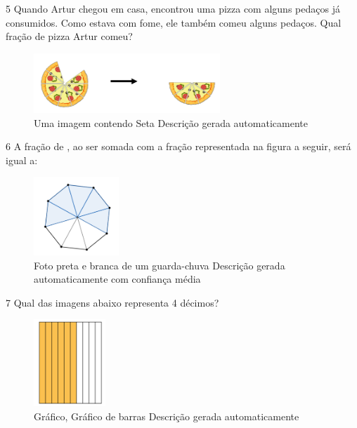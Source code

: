 \begin{escolha}
\begin{boxmedio}
\begin{boxmedio}
{\num{5} Quando Artur chegou em casa, encontrou uma pizza com alguns pedaços
já consumidos. Como estava com fome, ele também comeu alguns pedaços.
Qual fração de pizza Artur comeu?


\begin{figure}
\centering
\includegraphics[width=2.75521in,height=0.88894in]{./_SAEB_9_MAT/media/image45.png}
\caption{Uma imagem contendo Seta Descrição gerada automaticamente}
\end{figure}


\num{6} A fração de , ao ser somada com a fração
representada na figura a seguir, será igual a:

\begin{figure}
\centering
\includegraphics[width=1.26562in,height=1.16258in]{./_SAEB_9_MAT/media/image46.png}
\caption{Foto preta e branca de um guarda-chuva Descrição gerada
automaticamente com confiança média}
\end{figure}

\begin{boxpeq}

\num{7} Qual das imagens abaixo representa 4 décimos?

\begin{escolha}

\item
  \begin{figure}
  \centering
  \includegraphics[width=1.0625in,height=1.28788in]{./_SAEB_9_MAT/media/image47.png}
  \caption{Gráfico, Gráfico de barras Descrição gerada automaticamente}
  \end{figure}


\end{escolha}
\end{boxpeq}}
\end{boxmedio}
\end{boxmedio}
\end{escolha}
